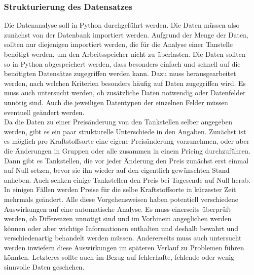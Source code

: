 \documentclass[12pt,a4paper,bibliography=totocnumbered,listof=totocnumbered]{scrartcl}
\begin{document}
\subsubsection{Strukturierung des Datensatzes}
Die Datenanalyse soll in Python durchgeführt werden. Die Daten müssen also zunächst von der Datenbank importiert werden. Aufgrund der Menge der Daten, sollten nur diejenigen importiert werden, die für die Analyse einer Tanstelle benötigt werden, um den Arbeitsspeicher nicht zu überlasten. Die Daten sollten so in Python abgespeichert werden, dass besonders einfach und schnell auf die benötigten Datensätze zugegriffen werden kann. Dazu muss herausgearbeitet werden, nach welchen Kriterien besonders häufig auf Daten zugegriffen wird. Es muss auch untersucht werden, ob zusätzliche Daten notwendig oder Datenfelder unnötig sind. Auch die jeweiligen Datentypen  der einzelnen Felder müssen eventuell geändert werden.\\
Da die Daten zu einer Preisänderung von den Tankstellen selber angegeben werden, gibt es ein paar strukturelle Unterschiede in den Angaben. Zunächst ist es möglich pro Kraftstoffsorte eine eigene Preisänderung vorzunehmen, oder aber die Änderungen in Gruppen oder alle zusammen in einem Pricing durchzuführen. Dann gibt es Tankstellen, die vor jeder Änderung den Preis zunächst erst einmal auf Null setzen, bevor sie ihn wieder auf den eigentlich gewünschten Stand anheben. Auch senken einige Tankstellen den Preis bei Tagesende auf Null herab. In einigen Fällen werden Preise für die selbe Kraftstoffsorte in kürzester Zeit mehrmals geändert. Alle diese Vorgehensweisen haben potentiell verschiedene Auswirkungen auf eine automatische Analyse. Es muss einerseits überprüft werden, ob Differenzen unnötigt sind und im Vorhinein angeglichen werden können oder aber wichtige Informationen enthalten und deshalb bewahrt und verschiedenartig behandelt werden müssen. Andererseits muss auch untersucht werden inwiefern diese Auswirkungen im späteren Verlauf zu Problemen führen könnten. Letzteres sollte auch im Bezug auf fehlerhafte, fehlende oder wenig sinnvolle Daten geschehen.\\

\end{document}
